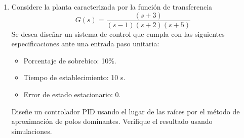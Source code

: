 \documentclass[11pt, spanish]{article}
\begin{document}
\begin{enumerate}
	\item Considere la planta caracterizada por la función de transferencia
		\begin{equation*}
			G(s) = \frac{(s+3)}{(s-1)(s+2)(s+5)}
		\end{equation*}
		Se desea diseñar un sistema de control que cumpla con las siguientes especificaciones ante una entrada paso unitaria:
		\begin{itemize}
			\item Porcentaje de sobrebico: 10\%.
			\item Tiempo de establecimiento: 10 s.
			\item Error de estado estacionario: 0.
		\end{itemize}
		Diseñe un controlador PID usando el lugar de las raíces por el método de aproximación de polos dominantes. Verifique el resultado usando simulaciones.
 	
\end{enumerate}
\end{document}
